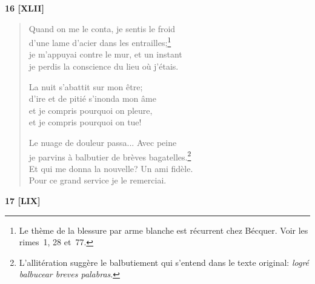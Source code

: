 \pagebreak

\begin{center}
  \textbf{16 [XLII]}
\end{center}

\begin{verse}
  Quand on me le conta, je sentis le froid \\
  d'une lame d'acier dans les entrailles;\footnote{Le thème de la
  blessure par arme blanche est récurrent chez Bécquer. Voir les
  rimes~1, 28 et~77.} \\
  je m'appuyai contre le mur, et un instant \\
  je perdis la conscience du lieu où j'étais.

  La nuit s'abattit sur mon être; \\
  d'ire et de pitié s'inonda mon âme \\
  et je compris pourquoi on pleure, \\
  et je compris pourquoi on tue!

  Le nuage de douleur passa... Avec peine \\
  je parvins à balbutier de brèves bagatelles.\footnote{L'allitération
  suggère le balbutiement qui s'entend dans le texte
  original: \emph{logré balbucear breves palabras}.} \\
  Et qui me donna la nouvelle? Un ami fidèle. \\
  Pour ce grand service je le remerciai.
\end{verse}

\bigskip

\begin{center}
  \textbf{17 [LIX]}
\end{center}

